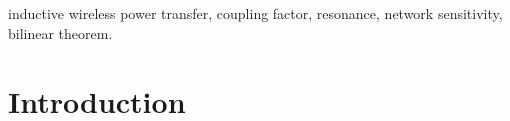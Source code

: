 \documentclass[journal]{IEEEtran}
\begin{document}
% 











\maketitle

\begin{abstract}

\end{abstract}

\begin{IEEEkeywords}
inductive wireless power transfer, coupling factor, resonance, network sensitivity, bilinear theorem.
\end{IEEEkeywords}






%
\IEEEpeerreviewmaketitle


\section{Introduction}
\end{document}

